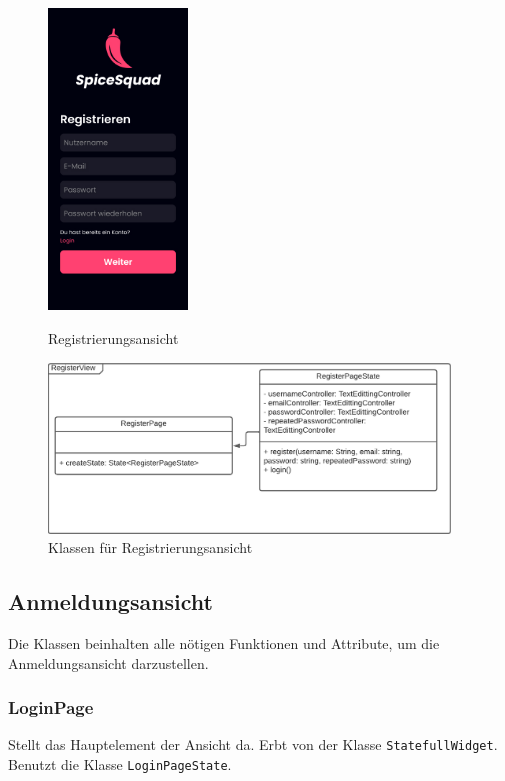 \documentclass[parskip=full]{scrartcl}
\begin{document}
    \begin{figure}[htp]
        \begin{minipage}
            [t]{0.49\textwidth}
            \centering
            \includegraphics[height=80mm]{images/Presentation-layer/RegisterView.jpg}
            \caption{Registrierungsansicht}
        \end{minipage}
        \begin{minipage}
            [t]{0.49\textwidth}
            \centering
            \includegraphics[width=0.95\textwidth]{images/Presentation-layer/RegisterViewClass.pdf}
            \caption{Klassen für Registrierungsansicht}
        \end{minipage}
    \end{figure}    
        
\newpage

\subsection{Anmeldungsansicht}
    Die Klassen beinhalten alle nötigen Funktionen und Attribute, um die Anmeldungsansicht darzustellen.

    \subsubsection{LoginPage}
        Stellt das Hauptelement der Ansicht da. Erbt von der Klasse \texttt{StatefullWidget}. Benutzt die Klasse \texttt{LoginPageState}.
\end{document}
